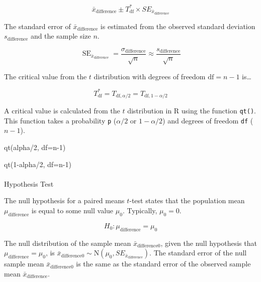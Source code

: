 \documentclass[
  letterpaper,
  DIV=11,
  numbers=noendperiod]{scrartcl}
\makeatletter
\let\oldparagraph\paragraph
\renewcommand{\paragraph}{
    \@ifstar
      \xxxParagraphStar
      \xxxParagraphNoStar
  }
\newcommand{\xxxParagraphStar}[1]{\oldparagraph*{#1}\mbox{}}
\newcommand{\xxxParagraphNoStar}[1]{\oldparagraph{#1}\mbox{}}
\newenvironment{Shaded}{\begin{snugshade}}{\end{snugshade}}
\newcommand{\AttributeTok}[1]{\textcolor[rgb]{0.40,0.45,0.13}{#1}}
\newcommand{\DecValTok}[1]{\textcolor[rgb]{0.68,0.00,0.00}{#1}}
\newcommand{\FunctionTok}[1]{\textcolor[rgb]{0.28,0.35,0.67}{#1}}
\newcommand{\NormalTok}[1]{\textcolor[rgb]{0.00,0.23,0.31}{#1}}
\newcommand{\SpecialCharTok}[1]{\textcolor[rgb]{0.37,0.37,0.37}{#1}}
\makeatother
\begin{document}
\[
\bar{x}_{\text{difference}} \pm T_{\text{df}}^* \times SE_{\bar{x}_{\text{difference}}}
\]

The standard error of \(\bar{x}_{\text{difference}}\) is estimated from
the observed standard deviation \(s_{\text{difference}}\) and the sample
size \(n\).

\[
\operatorname{SE}_{\bar{x}_{\text{difference}}}=\frac{\sigma_{\text{difference}}}{\sqrt{n}}\approx\frac{s_{\text{difference}}}{\sqrt{n}}
\]

The critical value from the \(t\) distribution with degrees of freedom
\(\text{df}=n-1\) is\ldots{}

\[
T_{\text{df}}^*=T_{\text{df},\alpha/2}=T_{\text{df}, 1-\alpha/2}
\]

A critical value is calculated from the \(t\) distribution in R using
the function \texttt{qt()}. This function takes a probability \texttt{p}
(\(\alpha/2\) or \(1-\alpha/2\)) and degrees of freedom \texttt{df}
(\(n-1\)).

\begin{Shaded}
\begin{Highlighting}[]
\FunctionTok{qt}\NormalTok{(alpha}\SpecialCharTok{/}\DecValTok{2}\NormalTok{, }\AttributeTok{df=}\NormalTok{n}\DecValTok{{-}1}\NormalTok{)}

\FunctionTok{qt}\NormalTok{(}\DecValTok{1}\SpecialCharTok{{-}}\NormalTok{alpha}\SpecialCharTok{/}\DecValTok{2}\NormalTok{, }\AttributeTok{df=}\NormalTok{n}\DecValTok{{-}1}\NormalTok{)}
\end{Highlighting}
\end{Shaded}

\paragraph{Hypothesis Test}\label{hypothesis-test-1}

The null hypothesis for a paired means \(t\)-test states that the
population mean \(\mu_{\text{difference}}\) is equal to some null value
\(\mu_0\). Typically, \(\mu_0=0\).

\[
H_0 \colon \mu_{\text{difference}}=\mu_0
\]

The null distribution of the sample mean
\(\bar{x}_{\text{difference0}}\), given the null hypothesis that
\(\mu_{\text{difference}}=\mu_0\), is
\(\bar{x}_{\text{difference0}} \sim \text{N}\left(\mu_0, SE_{\bar{x}_{\text{difference}}}\right)\).
The standard error of the null sample mean
\(\bar{x}_{\text{difference0}}\) is the same as the standard error of
the observed sample mean \(\bar{x}_{\text{difference}}\).
\end{document}
